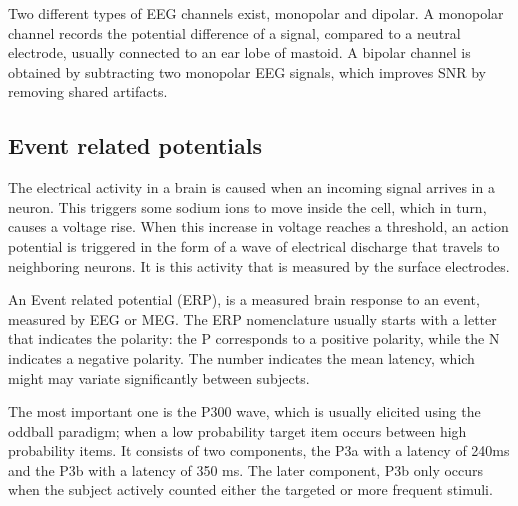 
Two different types of EEG channels exist, monopolar and dipolar. A monopolar channel records the potential difference of a signal, compared to a neutral electrode, usually connected to an ear lobe of mastoid. A bipolar channel is obtained by subtracting two monopolar EEG signals, which improves SNR by removing shared artifacts\cite{MonoBiPolar}. 

\subsection{Event related potentials}

The electrical activity in a brain is caused when an incoming signal arrives in a neuron. This triggers some sodium ions to move inside the cell, which in turn, causes a voltage rise\cite{ExtendedPaper}. When this increase in voltage reaches a threshold, an action potential is triggered in the form of a wave of electrical discharge that travels to neighboring neurons. It is this activity that is measured by the surface electrodes.

\npar

An Event related potential (ERP), is a measured brain response to an event, measured by EEG or MEG. The ERP nomenclature usually starts with a letter that indicates the polarity: the P corresponds to a positive polarity, while the N indicates a negative polarity. The number indicates the mean latency, which might may variate significantly between subjects.

\npar

The most important one is the P300 wave, which is usually elicited using the oddball paradigm; when a low probability target item occurs between high probability items. It consists of two components, the P3a with a latency of 240ms and the P3b with a latency of 350 ms\cite{P300TwoParts}. The later component, P3b only occurs when the subject actively counted either the targeted or more frequent stimuli.


